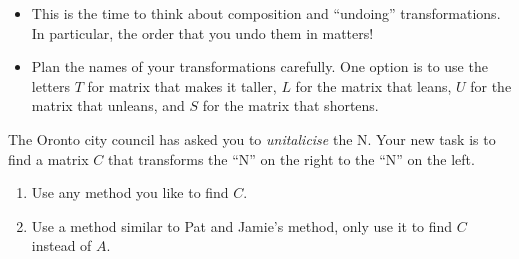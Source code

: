 \documentclass{workbook}
\begin{document}
\begin{iola}
\begin{slide}
	\begin{annotation}
		\begin{notes}
			\begin{itemize}
				\item This is the time to think about composition and ``undoing''
					transformations. In particular, the order that you undo
					them in matters!
				\item Plan the names of your transformations carefully. One option is to use the letters
					$T$ for matrix that makes it taller, $L$ for the matrix that leans,
					$U$ for the matrix that unleans, and $S$ for the matrix that shortens.
			\end{itemize}
		\end{notes}
	\end{annotation}

	The Oronto city council has asked you to \emph{unitalicise} the N.
	Your new task is to find a matrix $C$ that transforms the ``N'' on the right to the ``N'' on the left.
\begin{enumerate}
	\item Use any method you like to find $C$.
	\item Use a method similar to Pat and Jamie's method, only use it to find $C$ instead
		of $A$.
\end{enumerate}
\end{slide}
\end{iola}
\end{document}
